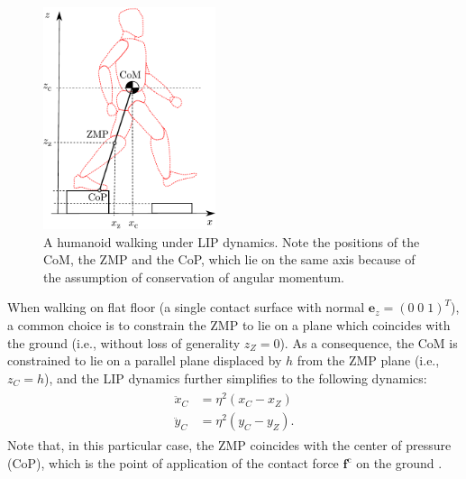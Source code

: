 \begin{figure}
    \centering
    \includegraphics[width=0.45\textwidth]{figures/LIPM_robot.pdf}
    \caption{A humanoid walking under LIP dynamics. Note the positions of the CoM, the ZMP and the CoP, which lie on the same axis because of the assumption of conservation of angular momentum.}
    \label{fig:LIPM-robot}
\end{figure}

When walking on flat floor (a single contact surface with normal
$\bm{e}_z=(0 \; 0\; 1)^T$),
a common choice is to constrain the ZMP to lie on
a plane which coincides with the ground (i.e., without loss of generality
$z_Z=0$). As a consequence, the CoM is constrained to lie on a parallel plane
displaced by $h$ from the ZMP plane (i.e., $z_C=h$), and
the LIP dynamics further simplifies to the following dynamics:
\begin{align}
    \label{eq:LIPM-xy}
    \begin{split}
        \ddot{x}_C &= \eta^2 (x_C - x_Z) \\
        \ddot{y}_C &= \eta^2 (y_C - y_Z).
    \end{split}
\end{align}
Note that, in this particular case, the ZMP coincides with the center of
pressure (CoP), which is the point of application of the contact force
$\bm{f}^{\mathrm{c}}$ on the ground \cite{SardainBessonnet2004}.

